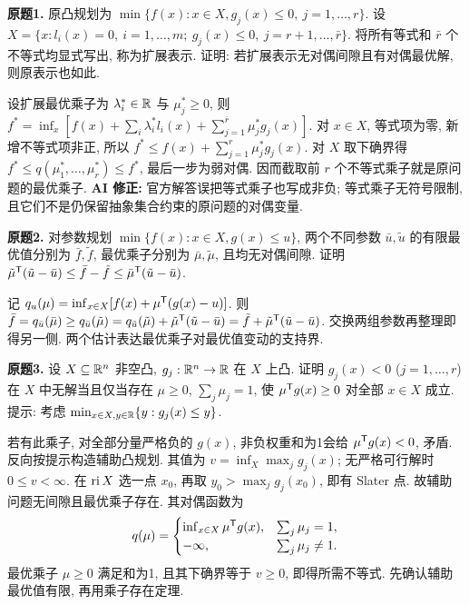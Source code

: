 \begin{exercise}\label{ass:6253-hw5-q1}
\textbf{原题1.} 原凸规划为 $\min\{f(x):x\in X,g_j(x)\le0,\ j=1,\ldots,r\}$. 设
$X=\{x:l_i(x)=0,\ i=1,\ldots,m;\ g_j(x)\le0,\ j=r+1,\ldots,\bar r\}$.
将所有等式和 $\bar r$ 个不等式均显式写出, 称为扩展表示. 证明: 若扩展表示无对偶间隙且有对偶最优解, 则原表示也如此.
\end{exercise}
\begin{solution}
设扩展最优乘子为 $\lambda_i^*\in\mathbb R$ 与 $\mu_j^*\ge0$, 则
$f^*=\inf_x[f(x)+\sum_i\lambda_i^*l_i(x)+\sum_{j=1}^{\bar r}\mu_j^*g_j(x)]$.
对 $x\in X$, 等式项为零, 新增不等式项非正, 所以
$f^*\le f(x)+\sum_{j=1}^r\mu_j^*g_j(x)$.
对 $X$ 取下确界得 $f^*\le q(\mu_1^*,\ldots,\mu_r^*)\le f^*$, 最后一步为弱对偶. 因而截取前 $r$ 个不等式乘子就是原问题的最优乘子. \textbf{AI 修正:} 官方解答误把等式乘子也写成非负; 等式乘子无符号限制, 且它们不是仍保留抽象集合约束的原问题的对偶变量.
\end{solution}

\begin{exercise}\label{ass:6253-hw5-q2}
\textbf{原题2.} 对参数规划 $\min\{f(x):x\in X,g(x)\le u\}$, 两个不同参数 $\bar u,\tilde u$ 的有限最优值分别为 $\bar f,\tilde f$, 最优乘子分别为 $\bar\mu,\tilde\mu$, 且均无对偶间隙. 证明
$\tilde\mu^{\mathsf T}(\tilde u-\bar u)\le\bar f-\tilde f\le\bar\mu^{\mathsf T}(\tilde u-\bar u)$.
\end{exercise}
\begin{solution}
记 $q_u(\mu)=\inf_{x\in X}[f(x)+\mu^{\mathsf T}(g(x)-u)]$. 则
$\bar f=q_{\bar u}(\bar\mu)\ge q_{\bar u}(\tilde\mu)
=q_{\tilde u}(\tilde\mu)+\tilde\mu^{\mathsf T}(\tilde u-\bar u)
=\tilde f+\tilde\mu^{\mathsf T}(\tilde u-\bar u)$.
交换两组参数再整理即得另一侧. 两个估计表达最优乘子对最优值变动的支持界.
\end{solution}

\begin{exercise}\label{ass:6253-hw5-q3}
\textbf{原题3.} 设 $X\subseteq\mathbb R^n$ 非空凸, $g_j:\mathbb R^n\to\mathbb R$ 在 $X$ 上凸. 证明 $g_j(x)<0$ ($j=1,\ldots,r$) 在 $X$ 中无解当且仅当存在 $\mu\ge0$, $\sum_j\mu_j=1$, 使 $\mu^{\mathsf T} g(x)\ge0$ 对全部 $x\in X$ 成立. 提示: 考虑 $\min_{x\in X,y\in\mathbb R}\{y:g_j(x)\le y\}$.
\end{exercise}
\begin{solution}
若有此乘子, 对全部分量严格负的 $g(x)$, 非负权重和为1会给 $\mu^{\mathsf T} g(x)<0$, 矛盾. 反向按提示构造辅助凸规划. 其值为 $v=\inf_X\max_j g_j(x)$; 无严格可行解时 $0\le v<\infty$. 在 $\operatorname{ri} X$ 选一点 $x_0$, 再取 $y_0>\max_jg_j(x_0)$, 即有 Slater 点. 故辅助问题无间隙且最优乘子存在. 其对偶函数为
\[
q(\mu)=\begin{cases}\inf_{x\in X}\mu^{\mathsf T} g(x),&\sum_j\mu_j=1,\\-\infty,&\sum_j\mu_j\ne1.\end{cases}
\]
最优乘子 $\mu\ge0$ 满足和为1, 且其下确界等于 $v\ge0$, 即得所需不等式. 先确认辅助最优值有限, 再用乘子存在定理.
\end{solution}

